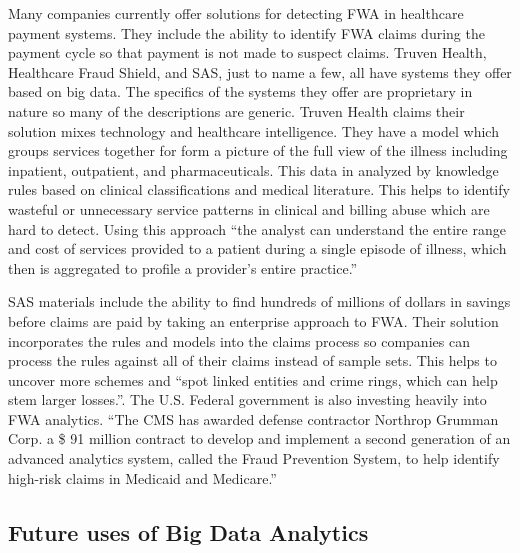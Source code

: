 \documentclass[sigconf]{acmart}
\begin{document}
Many companies currently offer solutions for detecting FWA in healthcare payment systems. 
They include the ability to identify FWA claims during the payment cycle so that payment 
is not made to suspect claims.  Truven Health\cite{TruvenHealth}, Healthcare Fraud Shield\cite{FraudShield}, 
and SAS\cite{SASHealth}, just to name a few, all have systems they offer based on big data.  The 
specifics of the systems they offer are proprietary in nature so many of the descriptions are 
generic.  Truven Health claims their solution mixes technology and healthcare intelligence.  They 
have a model which groups services together for form a picture of the full view of the illness 
including inpatient, outpatient, and pharmaceuticals. This data in analyzed by knowledge rules based 
on clinical classifications and medical literature.  This helps to identify wasteful or unnecessary 
service patterns in clinical and billing abuse which are hard to detect.  Using this approach 
``the analyst can understand the entire range and cost of services provided to a patient during a 
single episode of illness, which then is aggregated to profile a provider's entire practice.''\cite{TruvenHealth}

SAS materials include the ability to find hundreds of millions of dollars in savings before 
claims are paid by taking an enterprise approach to FWA.\cite{SASHealth}  Their solution 
incorporates the rules and models into the claims process so companies can process the rules 
against all of their claims instead of sample sets.  This helps to uncover more schemes and 
``spot linked entities and crime rings, which can help stem larger losses.''\cite{SASFraud}.  The 
U.S. Federal government is also investing heavily into FWA analytics.  ``The CMS has awarded 
defense contractor Northrop Grumman Corp. a \$ 91 million contract to develop and implement a 
second generation of an advanced analytics system, called the Fraud Prevention System, to 
help identify high-risk claims in Medicaid and Medicare.''\cite{ModernHealthcare}

\subsection{Future uses of Big Data Analytics}
\end{document}
